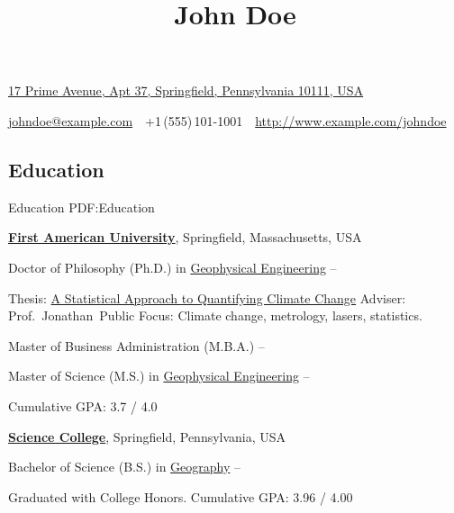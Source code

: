 \documentclass[letterpaper,MMMyyyy,nonstop]{simpleresumecv}
\newcommand{\CVAuthor}{John Doe}
\newcommand{\CVWebpage}{http://www.example.com/johndoe}
\begin{document}

\title{\CVAuthor}

\begin{subtitle}
\href{https://www.google.com/maps/place/17+Prime+Avenue,+Springfield,+Pennsylvania+10111,+USA}
{17 Prime Avenue, Apt 37, Springfield, Pennsylvania 10111, USA}
\par
\href{mailto:johndoe@example.com}
{johndoe@example.com}
\,\SubBulletSymbol\,
+1\,(555)\,101-1001
\,\SubBulletSymbol\,
\href{\CVWebpage}
{\url{\CVWebpage}}
\end{subtitle}

\begin{body}


\section
{Education}
{Education}
{PDF:Education}

\href{http://www.example.com/my-university}
{\textbf{First American University}},
Springfield, Massachusetts, USA

\GapNoBreak
\BulletItem
Doctor of Philosophy (Ph.D.) in
\href{http://www.example.com/my-department}
{Geophysical Engineering}
\hfill
{} --
\begin{detail}
\SubBulletItem
Thesis:
\href{http://www.example.com/my-phd-thesis}
{A Statistical Approach to Quantifying Climate Change}
\SubBulletItem
Adviser:
Prof.~Jonathan~Public
\SubBulletItem
Focus:
Climate change, metrology, lasers, statistics.
\end{detail}

\GapNoBreak
\BulletItem
Master of Business Administration (M.B.A.)
\hfill
{} --

\GapNoBreak
\BulletItem
Master of Science (M.S.) in
\href{http://www.example.com/my-department}
{Geophysical Engineering}
\hfill
{} --
\begin{detail}
\SubBulletItem
Cumulative GPA: 3.7 / 4.0
\end{detail}

\BigGap
\href{http://www.example.com/my-college}
{\textbf{Science College}},
Springfield, Pennsylvania, USA

\GapNoBreak
\BulletItem
Bachelor of Science (B.S.) in
\href{http://www.example.com/my-department}
{Geography}
\hfill
{} --
\begin{detail}
\SubBulletItem
Graduated with College Honors.
\SubBulletItem
Cumulative GPA: 3.96 / 4.00
\end{detail}


\end{body}
\end{document}
